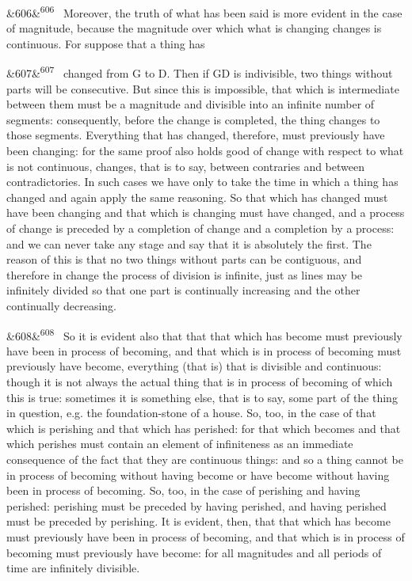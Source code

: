 \documentclass[12pt]{article}
\newcommand{\para}[1][]{\par\noindent\ifx&#1&\else\textsuperscript{\footnotesize #1}~\fi}
\begin{document}
\para[606] Moreover, the truth of what has been said is more evident in the case of magnitude, because the magnitude over which what is changing changes is continuous. For suppose that a thing has

\para[607] changed from G to D. Then if GD is indivisible, two things without parts will be consecutive. But since this is impossible, that which is intermediate between them must be a magnitude and divisible into an infinite number of segments: consequently, before the change is completed, the thing changes to those segments. Everything that has changed, therefore, must previously have been changing: for the same proof also holds good of change with respect to what is not continuous, changes, that is to say, between contraries and between contradictories. In such cases we have only to take the time in which a thing has changed and again apply the same reasoning. So that which has changed must have been changing and that which is changing must have changed, and a process of change is preceded by a completion of change and a completion by a process: and we can never take any stage and say that it is absolutely the first. The reason of this is that no two things without parts can be contiguous, and therefore in change the process of division is infinite, just as lines may be infinitely divided so that one part is continually increasing and the other continually decreasing.

\para[608] So it is evident also that that that which has become must previously have been in process of becoming, and that which is in process of becoming must previously have become, everything (that is) that is divisible and continuous: though it is not always the actual thing that is in process of becoming of which this is true: sometimes it is something else, that is to say, some part of the thing in question, e.g. the foundation-stone of a house. So, too, in the case of that which is perishing and that which has perished: for that which becomes and that which perishes must contain an element of infiniteness as an immediate consequence of the fact that they are continuous things: and so a thing cannot be in process of becoming without having become or have become without having been in process of becoming. So, too, in the case of perishing and having perished: perishing must be preceded by having perished, and having perished must be preceded by perishing. It is evident, then, that that which has become must previously have been in process of becoming, and that which is in process of becoming must previously have become: for all magnitudes and all periods of time are infinitely divisible.
\end{document}
